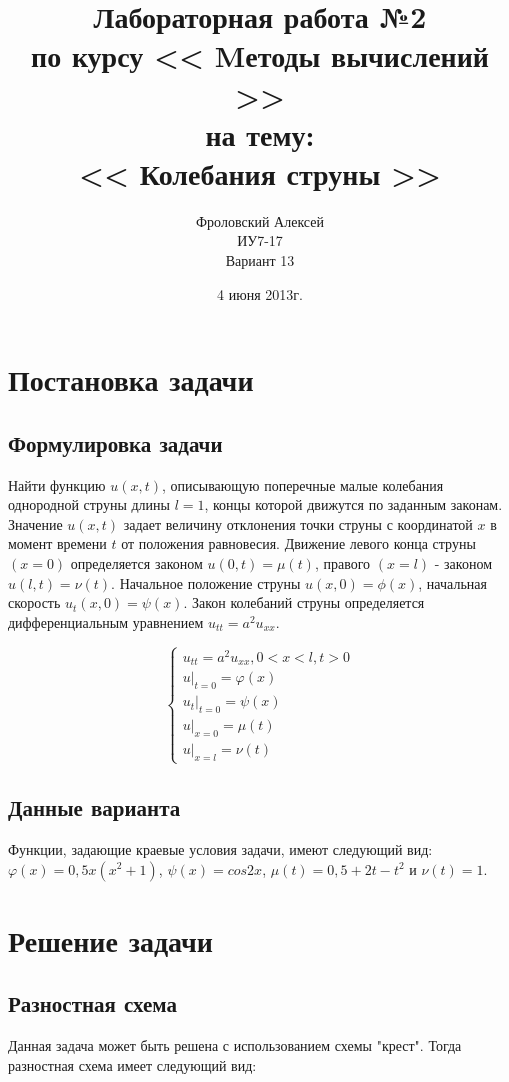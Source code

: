 \documentclass[a4paper,12pt]{report}
\author{Фроловский Алексей \\ ИУ7-17 \\ Вариант 13}
\title{Лабораторная работа №2 \\ по курсу << Mетоды вычислений >>  \\ на тему: \\  
<< Колебания струны >> }
\date{4 июня 2013г.}
\begin{document}
\maketitle

\chapter{Постановка задачи}
\section{Формулировка задачи}
Найти функцию $u(x, t)$, описывающую поперечные малые колебания однородной струны длины $l = 1$,
концы которой движутся по заданным законам. Значение $u(x, t)$ задает величину отклонения точки
струны с координатой $x$ в момент времени $t$ от положения равновесия. Движение левого конца струны
$(x = 0)$ определяется законом $u(0, t) = \mu(t)$, правого $(x = l)$ - законом $u(l, t) = \nu (t)$. Начальное
положение струны $u(x, 0) = \phi(x)$, начальная скорость $u_{t}(x, 0) = \psi(x)$. Закон колебаний струны
определяется дифференциальным уравнением $u_{tt} = a^{2}u_{xx}$.

\begin{displaymath}
	\left\{
		\begin{array}{l}
			u_{tt}= a^{2}u_{xx}, 0 < x < l, t > 0 \\
			u\vert_{t=0} =  \varphi(x)  \\
			u_{t}\vert_{t=0} =  \psi(x)  \\
			u\vert_{x=0} =  \mu(t) \\
			u\vert_{x=l} =  \nu(t)
		\end{array} \right.
\end{displaymath}

\section{Данные варианта}
Функции, задающие краевые условия задачи, имеют следующий вид:$\varphi(x) = 0,5x(x^{2} + 1)$,
$\psi(x) = cos 2x$, $\mu(t) = 0,5 + 2t - t^{2}$ и $\nu(t) = 1$.

\chapter{Решение задачи}
\section{Разностная схема}
Данная задача может быть решена с использованием схемы "крест". Тогда разностная схема имеет
следующий вид:
\end{document}
